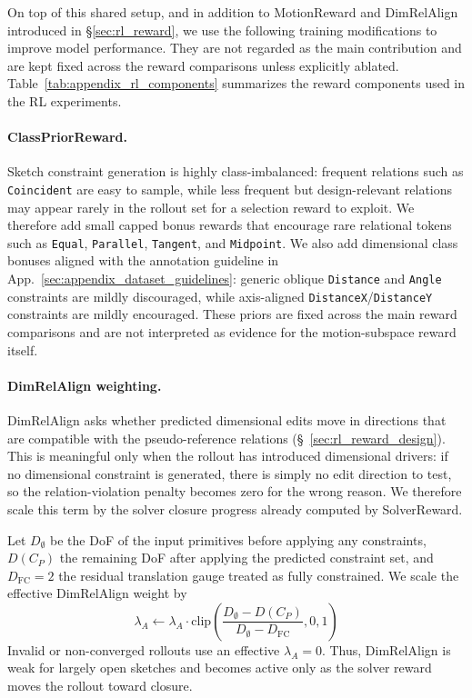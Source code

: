 On top of this shared setup, and in addition to MotionReward and DimRelAlign introduced in \S\ref{sec:rl_reward}, we use the following training modifications to improve model performance. They are not regarded as the main contribution and are kept fixed across the reward comparisons unless explicitly ablated. Table~\ref{tab:appendix_rl_components} summarizes the reward components used in the RL experiments.

\paragraph{ClassPriorReward.}
\label{sec:appendix_rl_class_prior}
Sketch constraint generation is highly class-imbalanced: frequent relations such as \texttt{Coincident} are easy to sample, while less frequent but design-relevant relations may appear rarely in the rollout set for a selection reward to exploit. We therefore add small capped bonus rewards that encourage rare relational tokens such as \texttt{Equal}, \texttt{Parallel}, \texttt{Tangent}, and \texttt{Midpoint}. We also add dimensional class bonuses aligned with the annotation guideline in App.~\ref{sec:appendix_dataset_guidelines}: generic oblique \texttt{Distance} and \texttt{Angle} constraints are mildly discouraged, while axis-aligned \texttt{DistanceX}/\texttt{DistanceY} constraints are mildly encouraged. These priors are fixed across the main reward comparisons and are not interpreted as evidence for the motion-subspace reward itself.

\paragraph{DimRelAlign weighting.}
\label{sec:appendix_rl_reldim_weight}
DimRelAlign asks whether predicted dimensional edits move in directions that are compatible with the pseudo-reference relations (\S~\ref{sec:rl_reward_design}). This is meaningful only when the rollout has introduced dimensional drivers: if no dimensional constraint is generated, there is simply no edit direction to test, so the relation-violation penalty becomes zero for the wrong reason. We therefore scale this term by the solver closure progress already computed by SolverReward.

Let $D_{\emptyset}$ be the DoF of the input primitives before applying any constraints, $D(C_P)$ the remaining DoF after applying the predicted constraint set, and $D_{\mathrm{FC}}=2$ the residual translation gauge treated as fully constrained. We scale the effective DimRelAlign weight by
\begin{equation}
\lambda_A \leftarrow \lambda_A \cdot
\mathrm{clip}\!\left(
\frac{D_{\emptyset}-D(C_P)}{D_{\emptyset}-D_{\mathrm{FC}}},
0,1
\right)
\end{equation}
Invalid or non-converged rollouts use an effective $\lambda_A=0$. Thus, DimRelAlign is weak for largely open sketches and becomes active only as the solver reward moves the rollout toward closure.

